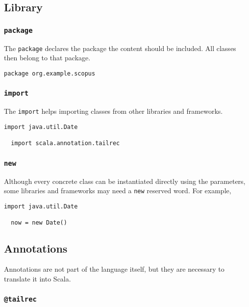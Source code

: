 \documentclass[12pt,a4paper]{article}
\makeatletter
\newcommand{\srccode}[1]{\texttt{{#1}}}
\newcommand{\reservedWord}[1]{{\color{blue}\srccode{#1}}\xspace}
\newcommand{\annotation}[1]{{\color{brown}\srccode{#1}}\xspace}
\newcommand{\spackage}{\reservedWord{package}}
\newcommand{\simport}{\reservedWord{import}}
\newcommand{\snew}{\reservedWord{new}}
\newcommand{\stailrec}{\annotation{@tailrec}}
\makeatother
\begin{document}
    \subsection{Library}

    \subsubsection{\spackage}

    The \spackage declares the package the content should be included.
    All classes then belong to that package.

    \begin{lstlisting}[label={lst:examplePackage}]
  package org.example.scopus
    \end{lstlisting}

    \subsubsection{\simport}

    The \simport helps importing classes from other libraries and frameworks.

    \begin{lstlisting}[label={lst:examplePackage}]
  import java.util.Date

  import scala.annotation.tailrec
    \end{lstlisting}

    \subsubsection{\snew}

    Although every concrete class can be instantiated directly using the parameters, some libraries and frameworks may need a \snew reserved word.
    For example,

    \begin{lstlisting}[label={lst:examplePackage}]
  import java.util.Date

  now = new Date()
    \end{lstlisting}

    \subsection{Annotations}

    Annotations are not part of the language itself, but they are necessary to translate it into Scala.

    \subsubsection{\stailrec}
\end{document}
